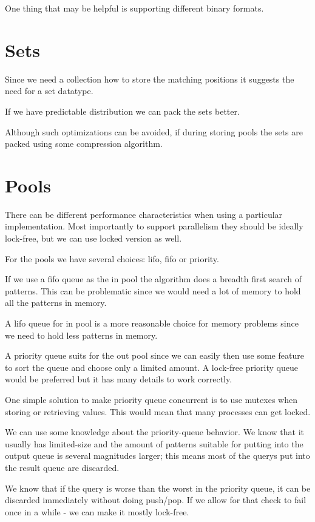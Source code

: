 One thing that may be helpful is supporting different binary formats.

\section{Sets}

Since we need a collection how to store the matching positions it suggests
the need for a set datatype.

If we have predictable distribution we can pack the sets better. 

Although such optimizations can be avoided, if during storing pools the
sets are packed using some compression algorithm.

\section{Pools}

There can be different performance characteristics when using a particular implementation. 
Most importantly to support parallelism they should be ideally lock-free, but we can use locked version as well.

For the pools we have several choices: lifo, fifo or priority.

If we use a fifo queue as the in pool the algorithm does a breadth first search of patterns.
This can be problematic since we would need a lot of memory to hold all the patterns in memory.

A lifo queue for in pool is a more reasonable choice for memory problems since we need to hold less patterns in memory.

A priority queue suits for the out pool since we can easily then use some feature to sort 
the queue and choose only a limited amount. A lock-free priority queue would be preferred
but it has many details to work correctly. 

One simple solution to make priority queue concurrent is to use mutexes when storing or
retrieving values. This would mean that many processes can get locked.

We can use some knowledge about the priority-queue behavior. We know that it usually
has limited-size and the amount of patterns suitable for putting into the output
queue is several magnitudes larger; this means most of the querys put into
the result queue are discarded. 

We know that if the query is worse than the worst in the priority queue, it can
be discarded immediately without doing push/pop. If we allow for that check
to fail once in a while - we can make it mostly lock-free.

